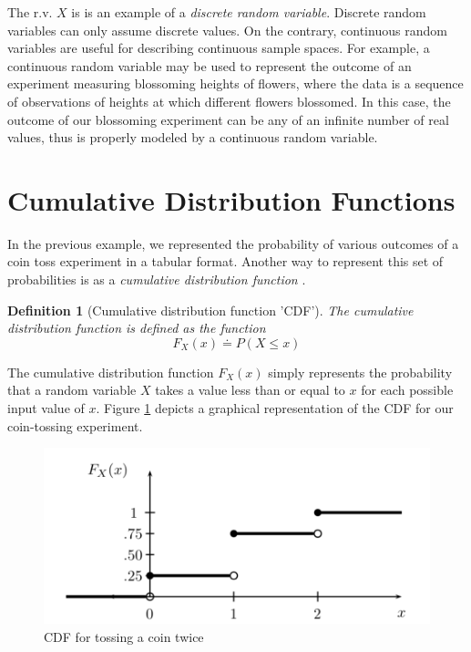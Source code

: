 \documentclass[
  12pt,
  oneside]{book}
\theoremstyle{definition}
\newtheorem{definition}{Definition}[chapter]
\theoremstyle{definition}
\theoremstyle{definition}
\theoremstyle{remark}
\begin{document}
The r.v. \(X\) is is an example of a \emph{discrete random variable}.
Discrete random variables can only assume discrete values.
On the contrary, continuous random variables are useful for describing continuous sample spaces.
For example, a continuous random variable may be used to represent the outcome of an experiment measuring blossoming heights of flowers, where the data is a sequence of observations of heights at which different flowers blossomed.
In this case, the outcome of our blossoming experiment can be any of an infinite number of real values, thus is properly modeled by a continuous random variable.

\hypertarget{cumulative-distribution-functions}{%
\section{Cumulative Distribution Functions}\label{cumulative-distribution-functions}}

In the previous example, we represented the probability of various outcomes of a coin toss experiment in a tabular format.
Another way to represent this set of probabilities is as a \emph{cumulative distribution function} \citep[  2.2]{Wasserman2004}.

\begin{definition}[Cumulative distribution function 'CDF']
\protect\hypertarget{def:cdf}{}{\label{def:cdf} {} }\emph{The cumulative distribution function is defined as the function}
\[F_{X}(x) \doteq P(X≤x)\]
\end{definition}

The cumulative distribution function \(F_{X}(x)\) simply represents the probability that a random variable \(X\) takes a value less than or equal to \(x\) for each possible input value of \(x\).
Figure \ref{fig:cdfimg} depicts a graphical representation of the CDF for our coin-tossing experiment.



\begin{figure}

{\centering \includegraphics[width=0.7\linewidth]{./images/cdf} 

}

\caption{CDF for tossing a coin twice \citep[  2.2]{Wasserman2004}}\label{fig:cdfimg}
\end{figure}
\end{document}
